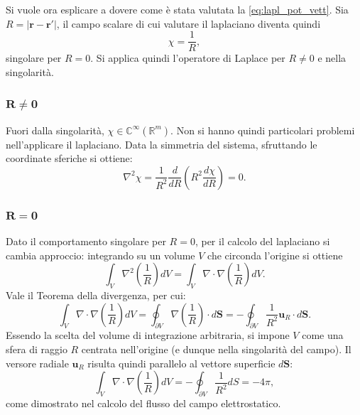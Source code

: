 \documentclass[a4paper,11pt]{report}
\begin{document}
\begin{approfondimento}[colback= white, colframe=green!35!black, no shadow, title={Calcolo del laplaciano del potenziale vettore}]
Si vuole ora esplicare a dovere come è stata valutata la \eqref{eq:lapl_pot_vett}. Sia ${R} = |\bm{r}-\bm{r}'|$, il campo scalare di cui valutare il laplaciano diventa quindi 
\begin{equation}
\chi = \frac{1}{{R}},
\end{equation}
singolare per ${R} = {0}$. Si applica quindi l'operatore di Laplace per ${R} \neq {0}$ e nella singolarità.

\subsubsection{$\bm{R} \neq \bm{0}$}
Fuori dalla singolarità, $\chi \in \mathbb{C}^{\infty}(\mathbb{R}^m)$. Non si hanno quindi particolari problemi nell'applicare il laplaciano. Data la simmetria del sistema, sfruttando le coordinate sferiche si ottiene:
\begin{equation}
\nabla^2 \chi  = \frac{1}{R^2} \frac{d}{dR}\left( R^2 \frac{d\chi}{dR} \right) = 0.
\end{equation}

\subsubsection{$\bm{R} = \bm{0}$}
Dato il comportamento singolare per ${R} = {0}$, per il calcolo del laplaciano si cambia approccio: integrando su un volume $V$ che circonda l'origine si ottiene
\begin{equation}
\int_V \nabla^2\left( \frac{1}{{R}}\right) dV = \int_V \nabla \cdot \nabla\left( \frac{1}{{R}}\right) dV.
\end{equation}
Vale il Teorema della divergenza, per cui:
\begin{equation}
\int_V \nabla \cdot \nabla\left( \frac{1}{{R}}\right) dV = \oint_{\partial V} \nabla\left( \frac{1}{{R}}\right) \cdot d\bm{S} = -\oint_{\partial V} \frac{1}{{R^2}}\bm{u}_R \cdot d\bm{S}.
\end{equation}
Essendo la scelta del volume di integrazione arbitraria, si impone $V$ come una sfera di raggio $R$ centrata nell'origine (e dunque nella singolarità del campo). Il versore radiale $\bm{u}_R$ risulta quindi parallelo al vettore superficie $d\bm{S}$:
\begin{equation}
\int_V \nabla \cdot \nabla\left( \frac{1}{{R}}\right) dV = -\oint_{\partial V} \frac{1}{{R^2}} d{S} = -4\pi,
\end{equation}
come dimostrato nel calcolo del flusso del campo elettrostatico. 


\end{approfondimento}
\end{document}
